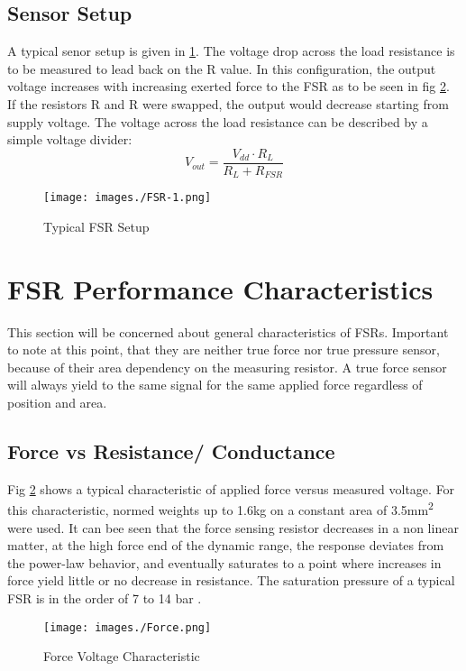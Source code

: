 \subsection{Sensor Setup}
\label{subsection:setup}
A typical senor setup is given in \ref{fig:setup}. The voltage drop across the load resistance is to be measured to lead back on the R value. In this configuration, the output voltage increases with increasing exerted force to the FSR as to be seen in fig \ref{fig:forcevalues}. If the resistors R and R were swapped, the output would decrease starting from supply voltage. The voltage across the load resistance can be described by a simple voltage divider:
\begin{equation}
    V_{out}=\frac{V_{dd}\cdot R_L}{R_L+R_{FSR}}
    \label{eq:divider}
\end{equation}
\begin{figure}[ht]
    \centering
    \texttt{[image: images./FSR-1.png]}
    \caption[FSR Setup]{Typical FSR Setup}
    \label{fig:setup}
\end{figure}




\section{FSR Performance Characteristics}
This section will be concerned about general characteristics of FSRs. Important to note at this point, that they are neither true force nor true pressure sensor, because of their area dependency on the measuring resistor. A true force sensor will always yield to the same signal for the same applied force regardless of position and area. 

\subsection{Force vs Resistance/ Conductance}
Fig \ref{fig:forcevalues} shows a typical characteristic of applied force versus measured voltage. For this characteristic, normed weights up to 1.6kg on a constant area of 3.5mm\textsuperscript{2} were used. It can bee seen that the force sensing resistor decreases in a non linear matter, at the high force end of the dynamic range, the response deviates from the power-law behavior, and eventually saturates to a point where increases in force yield little or no decrease in resistance. The saturation pressure of a typical FSR is in the order of 7 to 14 bar \cite{interlinkelectronics}.
\begin{figure}[ht]
    \centering
    \texttt{[image: images./Force.png]}
    \caption[Force Characteristic]{Force Voltage Characteristic}
    \label{fig:forcevalues}
\end{figure}

